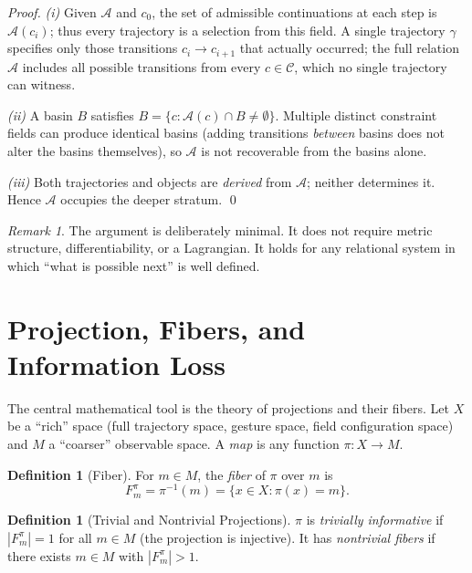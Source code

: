 \documentclass[12pt, a4paper, twoside]{article}
\theoremstyle{plain}
\theoremstyle{definition}
\newtheorem{definition}[theorem]{Definition}
\theoremstyle{remark}
\newtheorem{remark}[theorem]{Remark}
\newcommand{\Acc}{\mathcal{A}}
\newcommand{\Conf}{\mathcal{C}}
\newcommand{\Proj}{\pi}
\newcommand{\Fibover}[2]{F^{#1}_{#2}}
\begin{document}
\begin{proof}
\emph{(i)} Given $\Acc$ and $c_0$, the set of admissible continuations at each
step is $\Acc(c_i)$; thus every trajectory is a selection from this field.
A single trajectory $\gamma$ specifies only those transitions $c_i \to c_{i+1}$
that actually occurred; the full relation $\Acc$ includes all possible
transitions from every $c \in \Conf$, which no single trajectory can witness.

\emph{(ii)} A basin $B$ satisfies $B = \{c : \Acc(c) \cap B \neq \emptyset\}$.
Multiple distinct constraint fields can produce identical basins (adding
transitions \emph{between} basins does not alter the basins themselves), so
$\Acc$ is not recoverable from the basins alone.

\emph{(iii)} Both trajectories and objects are \emph{derived} from $\Acc$;
neither determines it. Hence $\Acc$ occupies the deeper stratum.
\qed
\end{proof}

\begin{remark}
The argument is deliberately minimal. It does not require metric structure,
differentiability, or a Lagrangian. It holds for any relational system in
which ``what is possible next'' is well defined.
\end{remark}

\section{Projection, Fibers, and Information Loss}
\label{sec:projection}

The central mathematical tool is the theory of projections and their fibers.
Let $X$ be a ``rich'' space (full trajectory space, gesture space, field
configuration space) and $M$ a ``coarser'' observable space. A \emph{map}
is any function $\Proj: X \to M$.

\begin{definition}[Fiber]
For $m \in M$, the \emph{fiber} of $\Proj$ over $m$ is
\[
  \Fibover{\Proj}{m} = \Proj^{-1}(m) = \{x \in X : \Proj(x) = m\}.
\]
\end{definition}

\begin{definition}[Trivial and Nontrivial Projections]
$\Proj$ is \emph{trivially informative} if $|\Fibover{\Proj}{m}| = 1$ for all
$m \in M$ (the projection is injective). It has \emph{nontrivial fibers} if
there exists $m \in M$ with $|\Fibover{\Proj}{m}| > 1$.
\end{definition}
\end{document}
